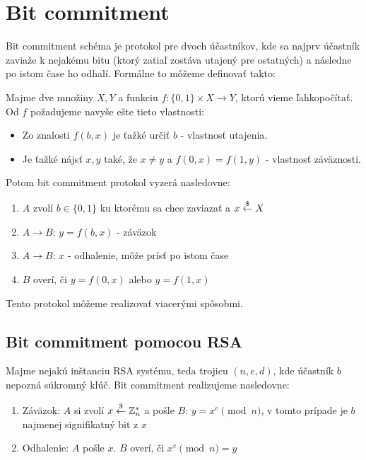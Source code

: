 \section{Bit commitment}

Bit commitment schéma je protokol pre dvoch účastníkov, kde sa najprv účastník
zaviaže k nejakému bitu (ktorý zatiaľ zostáva utajený pre ostatných) 
a následne po istom čase ho odhalí. Formálne to môžeme definovať takto:

\begin{definicia}
Majme dve množiny $X,Y$ a funkciu $f\colon \{0,1\} \times X \to Y$, ktorú vieme
\clqq ľahko\crqq počítať. Od $f$ požadujeme navyše ešte tieto vlastnosti:
\begin{itemize}
\item Zo znalosti $f(b,x)$ je ťažké určiť $b$ - vlastnosť utajenia.
\item Je ťažké nájsť $x, y$ také, že $x \neq y$ a $f(0,x) = f(1,y)$ - vlastnosť záväznosti.
\end{itemize}
Potom bit commitment protokol vyzerá nasledovne:
\begin{enumerate}
\item $A$ zvolí $b \in \{0,1\}$ ku ktorému sa chce zaviazať a $x \overset{\$}{\leftarrow} X$
\item $A \to B$: $y = f(b,x)$ - záväzok
\item $A \to B$: $x$ - odhalenie, môže prísť po istom čase
\item $B$ overí, či $y = f(0,x)$ alebo $y = f(1,x)$
\end{enumerate}
\end{definicia}

Tento protokol môžeme realizovať viacerými spôsobmi. 

\subsection{Bit commitment pomocou RSA}

Majme nejakú inštanciu RSA systému, teda trojicu $(n,e,d)$, kde účastník $b$ nepozná súkromný kľúč.
Bit commitment realizujeme nasledovne:
\begin{enumerate}
\item Záväzok: $A$ si zvolí $x \overset{\$}{\leftarrow} \mathbb{Z}_n^*$ a pošle $B$: $y = x^e \pmod n$, v tomto prípade je $b$ najmenej signifikatný bit z $x$
\item Odhalenie: $A$ pošle $x$. $B$ overí, či $x^e \pmod n = y$
\end{enumerate}


